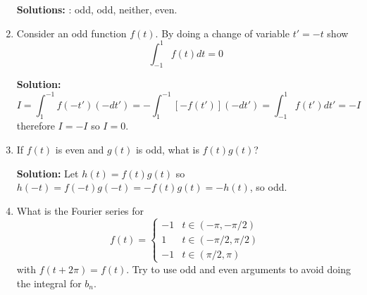 \documentclass[12pt]{article}
\begin{document}
\begin{enumerate}
\textbf{Solutions: }: odd, odd, neither, even.


\item Consider an odd function $f(t)$. By doing a change of variable
  $t'=-t$ show 
 \begin{equation}
\int_{-1}^1f(t)dt=0
\end{equation}

\textbf{Solution: }
\begin{equation}
I=\int_{1}^{-1}f(-t')(-dt')=-\int_{1}^{-1}[-f(t')](-dt')=\int_{-1}^1f(t')dt'=-I
\end{equation}
therefore $I=-I$ so $I=0$.

\item If $f(t)$ is even and $g(t)$ is odd, what is $f(t)g(t)$?

\textbf{Solution: } Let $h(t)=f(t)g(t)$ so
$h(-t)=f(-t)g(-t)=-f(t)g(t)=-h(t)$, so odd.

\item What is the Fourier series for 
\begin{equation}
f(t)=\left\{\begin{array}{ll}-1&t\in(-\pi,-\pi/2)\\
                             1 &t\in(-\pi/2,\pi/2)\\
                             -1&t\in(\pi/2,\pi)
\end{array}\right.
\end{equation}
with $f(t+2\pi)=f(t)$. Try to use odd and even arguments to avoid
doing the integral for $b_n$.


\end{enumerate}
\end{document}
